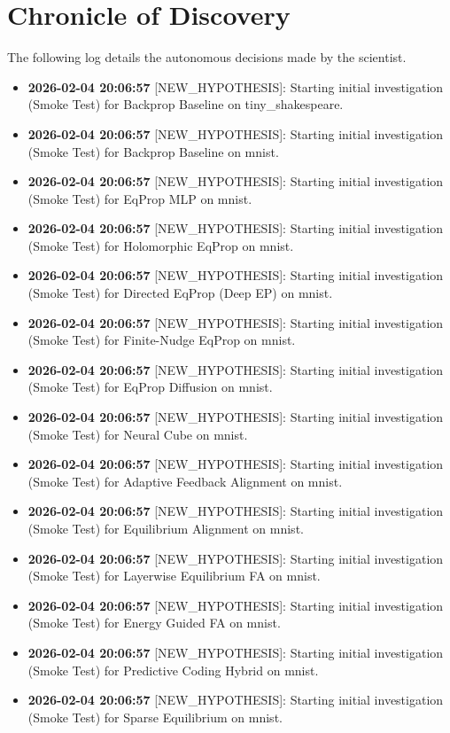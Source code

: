 \documentclass{article}
\begin{document}
\section{Chronicle of Discovery}
The following log details the autonomous decisions made by the scientist.
\begin{itemize}
\item \textbf{2026-02-04 20:06:57} [NEW_HYPOTHESIS]: Starting initial investigation (Smoke Test) for Backprop Baseline on tiny\_shakespeare.
\item \textbf{2026-02-04 20:06:57} [NEW_HYPOTHESIS]: Starting initial investigation (Smoke Test) for Backprop Baseline on mnist.
\item \textbf{2026-02-04 20:06:57} [NEW_HYPOTHESIS]: Starting initial investigation (Smoke Test) for EqProp MLP on mnist.
\item \textbf{2026-02-04 20:06:57} [NEW_HYPOTHESIS]: Starting initial investigation (Smoke Test) for Holomorphic EqProp on mnist.
\item \textbf{2026-02-04 20:06:57} [NEW_HYPOTHESIS]: Starting initial investigation (Smoke Test) for Directed EqProp (Deep EP) on mnist.
\item \textbf{2026-02-04 20:06:57} [NEW_HYPOTHESIS]: Starting initial investigation (Smoke Test) for Finite-Nudge EqProp on mnist.
\item \textbf{2026-02-04 20:06:57} [NEW_HYPOTHESIS]: Starting initial investigation (Smoke Test) for EqProp Diffusion on mnist.
\item \textbf{2026-02-04 20:06:57} [NEW_HYPOTHESIS]: Starting initial investigation (Smoke Test) for Neural Cube on mnist.
\item \textbf{2026-02-04 20:06:57} [NEW_HYPOTHESIS]: Starting initial investigation (Smoke Test) for Adaptive Feedback Alignment on mnist.
\item \textbf{2026-02-04 20:06:57} [NEW_HYPOTHESIS]: Starting initial investigation (Smoke Test) for Equilibrium Alignment on mnist.
\item \textbf{2026-02-04 20:06:57} [NEW_HYPOTHESIS]: Starting initial investigation (Smoke Test) for Layerwise Equilibrium FA on mnist.
\item \textbf{2026-02-04 20:06:57} [NEW_HYPOTHESIS]: Starting initial investigation (Smoke Test) for Energy Guided FA on mnist.
\item \textbf{2026-02-04 20:06:57} [NEW_HYPOTHESIS]: Starting initial investigation (Smoke Test) for Predictive Coding Hybrid on mnist.
\item \textbf{2026-02-04 20:06:57} [NEW_HYPOTHESIS]: Starting initial investigation (Smoke Test) for Sparse Equilibrium on mnist.

\end{itemize}
\end{document}
